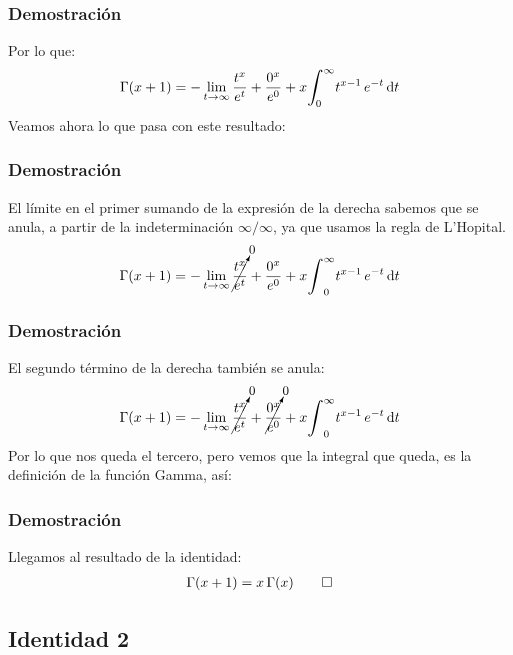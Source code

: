 \documentclass[12pt]{beamer}
\begin{document}
\begin{frame}
\frametitle{Demostración}
Por lo que:
\pause
\begin{align*}
\Gamma (x + 1) = - \lim_{t \to \infty} \dfrac{t^{x}}{e^t} + \dfrac{0^{x}}{e^{0}} + x \scaleint{6ex}_{\bs 0}^{\infty} t^{x-1} \, e^{-t} \dd{t}
\end{align*}
\pause
Veamos ahora lo que pasa con este resultado:
\end{frame}
\begin{frame}
\frametitle{Demostración}
El límite en el primer sumando de la expresión de la derecha sabemos que se anula, a partir de la indeterminación $\infty / \infty$, ya que usamos la regla de L'Hopital.
\pause
\begin{align*}
\Gamma (x + 1) = - \lim_{t \to \infty} \cancelto{\text{\small{0}}}{\dfrac{t^{x}}{e^t}} + \dfrac{0^{x}}{e^{0}} + x \scaleint{6ex}_{0}^{\infty} t^{x-1} \, e^{-t} \dd{t}
\end{align*}
\end{frame}
\begin{frame}
\frametitle{Demostración}
El segundo término de la derecha también se anula:
\pause
\begin{align*}
\Gamma (x + 1) = - \lim_{t \to \infty} \cancelto{\text{\small{0}}}{\dfrac{t^{x}}{e^t}} + \cancelto{\text{\small{0}}}{\dfrac{0^{x}}{e^{0}}} + x \scaleint{6ex}_{0}^{\infty} t^{x-1} \, e^{-t} \dd{t}
\end{align*}
\pause
Por lo que nos queda el tercero, pero vemos que la integral que queda, es la definición de la función Gamma, así:
\end{frame}
\begin{frame}
\frametitle{Demostración}
Llegamos al resultado de la identidad:
\begin{align}
\Gamma (x + 1) = x \, \Gamma (x) \qed
\label{eq:ecuacion_01_04_01}
\end{align}
\end{frame}

\subsection{Identidad 2}
\end{document}
